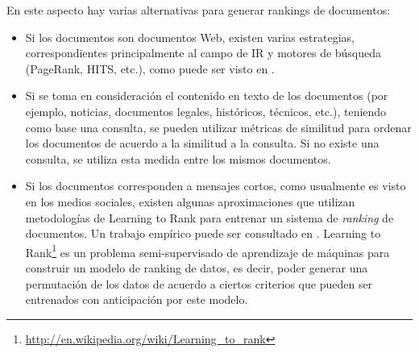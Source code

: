    En este aspecto hay varias alternativas para generar rankings de
   documentos:

\begin{itemize}
\item Si los documentos son documentos Web, existen
     varias estrategias, correspondientes principalmente al campo de
     IR y motores de búsqueda (PageRank, HITS, etc.), como puede ser
     visto en \cite{signorini2005survey}.
\item Si se toma en consideración el contenido en texto de los
     documentos (por ejemplo, noticias, documentos legales,
     históricos, técnicos, etc.), teniendo como base una consulta, se
     pueden utilizar métricas de similitud para ordenar los documentos
     de acuerdo a la similitud a la consulta. Si no existe una
     consulta, se utiliza esta medida entre los mismos documentos.
\item Si los documentos corresponden a mensajes cortos, como usualmente
     es visto en los medios sociales, existen algunas aproximaciones
     que utilizan metodologías de Learning to Rank para entrenar un
     sistema de \emph{ranking} de documentos. Un trabajo empírico puede ser
     consultado en \cite{Duan:2010:ESL:1873781.1873815}. Learning to
     Rank\footnote{\href{http://en.wikipedia.org/wiki/Learning\_to\_rank}{http://en.wikipedia.org/wiki/Learning\_to\_rank} }
     es un problema semi-supervisado de aprendizaje de
     máquinas para construir un modelo de ranking de datos, es decir,
     poder generar una permutación de los datos de acuerdo a ciertos
     criterios que pueden ser entrenados con anticipación por este
     modelo.
\end{itemize}